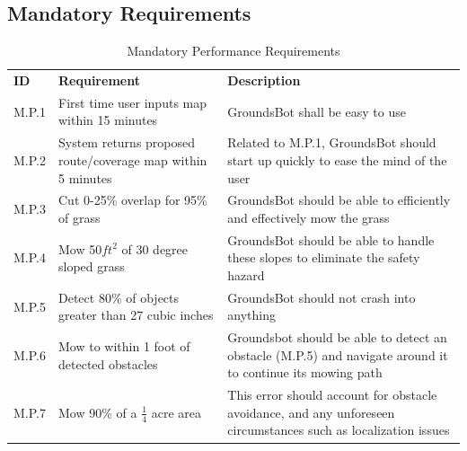 \documentclass{article}
\begin{document}
\subsection{Mandatory Requirements}
\begin{center}
  \begin{table}[H]
  \caption{Mandatory Performance Requirements}
  \label{table:mandatory performance}
  \def\arraystretch{1.5}
  	\begin{tabularx}{\textwidth}{ lXX }
		\textbf{ID} & \textbf{Requirement} & \textbf{Description} \\
    	M.P.1 &
    	First time user inputs map within 15 minutes &
    	GroundsBot shall be easy to use \\
   		M.P.2 &
   		System returns proposed route/coverage map within 5 minutes &
   		Related to M.P.1, GroundsBot should start up quickly to ease the mind of the user \\
   		M.P.3 &
   		Cut 0-25\% overlap for 95\% of grass &
   		GroundsBot should be able to efficiently and effectively mow the grass \\
		M.P.4 &
		Mow 50$ft^2$ of 30 degree sloped grass &
		GroundsBot should be able to handle these slopes to eliminate the safety hazard \\
		M.P.5 &
		Detect 80\% of objects greater than 27 cubic inches &
		GroundsBot should not crash into anything \\
		M.P.6 &
		Mow to within 1 foot of detected obstacles &
		Groundsbot should be able to detect an obstacle (M.P.5) and navigate around it to continue its mowing path \\
		M.P.7 &
		Mow 90\% of a $\frac{1}{4}$ acre area &
		This error should account for obstacle avoidance, and any unforeseen circumstances such as localization issues \\
	\end{tabularx}
  \end{table}
\end{center}
\end{document}
